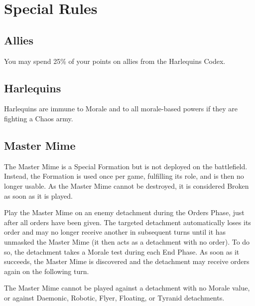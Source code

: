 \section{Special Rules}

\subsection{Allies}

You may spend 25\% of your points on allies from the Harlequins Codex.

\subsection{Harlequins}

Harlequins are immune to Morale and to all morale-based powers if they are fighting a Chaos army.

\subsection{Master Mime}

The Master Mime is a Special Formation but is not deployed on the battlefield. Instead, the Formation is used once per game, fulfilling its role, and is then no longer usable. As the Master Mime cannot be destroyed, it is considered Broken as soon as it is played.

Play the Master Mime on an enemy detachment during the Orders Phase, just after all orders have been given. The targeted detachment automatically loses its order and may no longer receive another in subsequent turns until it has unmasked the Master Mime (it then acts as a detachment with no order). To do so, the detachment takes a Morale test during each End Phase. As soon as it succeeds, the Master Mime is discovered and the detachment may receive orders again on the following turn.

The Master Mime cannot be played against a detachment with no Morale value, or against Daemonic, Robotic, Flyer, Floating, or Tyranid detachments.
